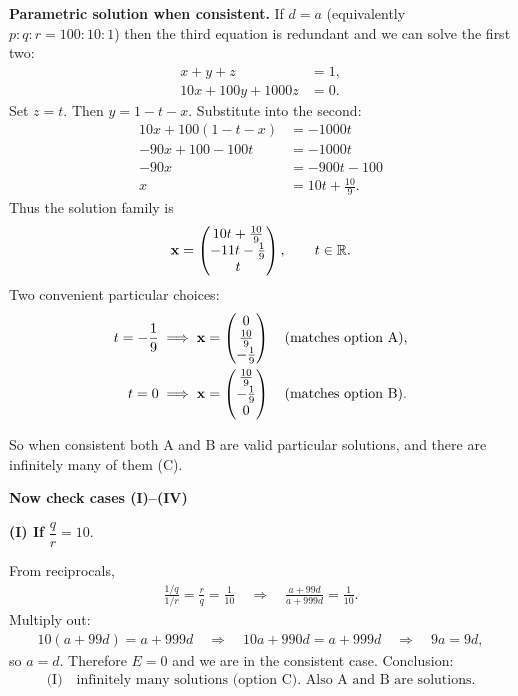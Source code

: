 \documentclass[12pt]{article}
\begin{document}
\noindent\textbf{Parametric solution when consistent.} If \(d=a\) (equivalently \(p:q:r=100:10:1\)) then the third equation is redundant and we can solve the first two:
\begin{align}
x+y+z &= 1, \\
10x+100y+1000z &= 0.
\end{align}
Set \(z=t\). Then \(y=1-t-x\). Substitute into the second:
\begin{align}
10x + 100(1-t-x) &= -1000t
\\
-90x +100 -100t &= -1000t
\\
-90x &= -900t -100
\\
x &= 10t + \frac{10}{9}.
\end{align}
Thus the solution family is
\begin{align}
\mathbf{x} = \begin{pmatrix}10t+\frac{10}{9}\\ -11t-\frac{1}{9}\\ t\end{pmatrix},\qquad t\in\mathbb{R}.
\end{align}
Two convenient particular choices:
\begin{align}
t=-\frac{1}{9} &\implies \mathbf{x}=\begin{pmatrix}0\\\frac{10}{9}\\ -\frac{1}{9}\end{pmatrix}\quad\text{(matches option A)},\\
t=0 &\implies \mathbf{x}=\begin{pmatrix}\frac{10}{9}\\ -\frac{1}{9}\\ 0\end{pmatrix}\quad\text{(matches option B)}.
\end{align}

So when consistent both A and B are valid particular solutions, and there are infinitely many of them (C).


\noindent\textbf{Now check cases (I)--(IV) }


\noindent\textbf{(I) If } $\dfrac{q}{r}=10$.

From reciprocals,
\begin{align}
\frac{1/q}{1/r} = \frac{r}{q} = \frac{1}{10} \quad\Longrightarrow\quad
\frac{a+99d}{a+999d} = \frac{1}{10}.
\end{align}
Multiply out:
\begin{align}
10(a+99d) = a+999d \quad\Longrightarrow\quad 10a+990d = a+999d \quad\Longrightarrow\quad 9a = 9d,
\end{align}
so \(a=d\). Therefore \(E=0\) and we are in the consistent case. Conclusion:
\begin{align}
\text{(I)}\quad\boxed{\text{infinitely many solutions (option C). \ Also A and B are solutions.}}
\end{align}
\end{document}
